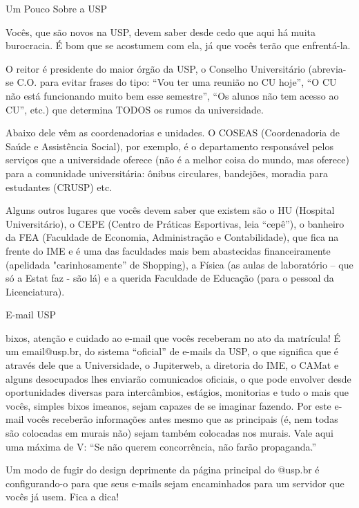 \begin{secao}{Um Pouco Sobre a USP}

Vocês, que são novos na USP, devem saber desde cedo que aqui há muita
burocracia. É bom que se acostumem com ela, já que vocês terão que enfrentá-la. 

O reitor é presidente do maior órgão da USP, o Conselho Universitário (abrevia-se
C.O. para evitar frases do tipo: ``Vou ter uma reunião no CU hoje'', ``O CU não
está funcionando muito bem esse semestre'', ``Os alunos não tem acesso ao CU'',
etc.) que determina TODOS os rumos da universidade.

Abaixo dele vêm as coordenadorias e unidades. O COSEAS (Coordenadoria de Saúde
e Assistência Social), por exemplo, é o departamento responsável pelos serviços
que a universidade oferece (não é a melhor coisa do mundo, mas oferece) para a
comunidade universitária: ônibus circulares, bandejões, moradia para estudantes
(CRUSP) etc.

Alguns outros lugares que vocês devem saber que existem são o HU (Hospital
Universitário), o CEPE (Centro de Práticas Esportivas, leia “cepê”), o banheiro
da FEA (Faculdade de Economia, Administração e Contabilidade), que fica na
frente do IME e é uma das faculdades mais bem abastecidas financeiramente
(apelidada "carinhosamente” de Shopping), a Física (as aulas de laboratório –
que só a Estat faz - são lá) e a querida Faculdade de Educação (para o pessoal
da Licenciatura).

\begin{subsecao}{E-mail USP}

bixos, atenção e cuidado ao e-mail que vocês receberam no ato da matrícula! É um
email@usp.br, do sistema “oficial” de e-mails da USP, o que significa que é
através dele que a Universidade, o Jupiterweb, a diretoria do IME, o CAMat e
alguns desocupados lhes enviarão comunicados oficiais, o que pode envolver desde
oportunidades diversas para intercâmbios, estágios, monitorias e tudo o mais que
vocês, simples bixos imeanos, sejam capazes de se imaginar fazendo. Por este e-mail
vocês receberão informações antes mesmo que as principais (é, nem todas são
colocadas em murais não) sejam também colocadas nos murais. Vale aqui uma máxima
de V: “Se não querem concorrência, não farão propaganda.” 

Um modo de fugir do design deprimente da página principal do @usp.br é
configurando-o para que seus e-mails sejam encaminhados para um servidor que
vocês já usem. Fica a dica! 


\end{subsecao}
\end{secao}

